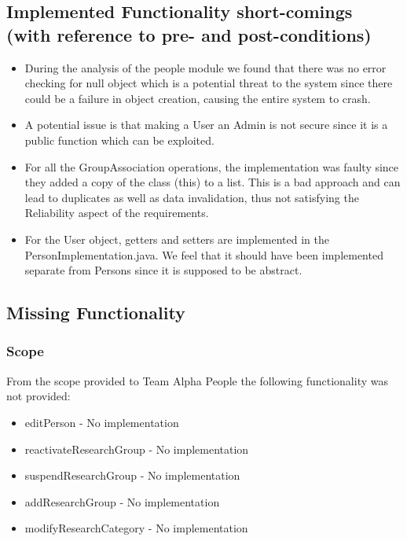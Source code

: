 \documentclass{article}
\begin{document}
    \subsection{Implemented Functionality short-comings (with reference to pre- and post-conditions)}
	\begin{itemize}
	
	    \item During the analysis of the people module we found that there was no error checking for null object which is a potential threat to the system since there could be a failure in object creation, causing the entire system to crash.
	    \item A potential issue is that making a User an Admin is not secure since it is a public function which can be exploited.
	    \item For all the GroupAssociation operations, the implementation was faulty since they added a copy of the class (this) to a list. This is a bad approach and can lead to duplicates as well as data invalidation, thus not satisfying the Reliability aspect of the requirements.
	    \item For the User object, getters and setters are implemented in the PersonImplementation.java. We feel that it should have been implemented separate from Persons since it is supposed to be abstract. 

	\end{itemize}

    \subsection{Missing Functionality}
	\subsubsection{Scope}
	From the scope provided to Team Alpha People the following functionality was not provided:
	\begin{itemize}
		\item editPerson - No implementation
		\item reactivateResearchGroup - No implementation
		\item suspendResearchGroup - No implementation
		\item addResearchGroup - No implementation
		\item modifyResearchCategory - No implementation
	\end{itemize}
	
\end{document}
